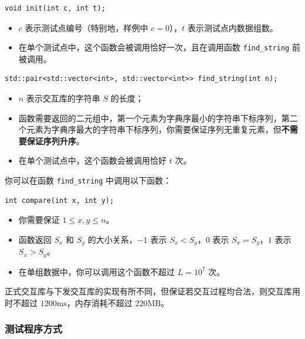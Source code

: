 \documentclass[12pt,a4paper,oneside]{ctexart}
\newcommand{\tightlist}{}
\begin{document}
\begin{verbatim}
void init(int c, int t);
\end{verbatim}

\begin{itemize}
\tightlist
\item
  \(c\) 表示测试点编号（特别地，样例中 \(c = 0\)），\(t\) 表示测试点内数据组数。
\item
  在单个测试点中，这个函数会被调用恰好一次，且在调用函数 \texttt{find\_string} 前被调用。
\end{itemize}

\begin{verbatim}
std::pair<std::vector<int>, std::vector<int>> find_string(int n);
\end{verbatim}

\begin{itemize}
\tightlist
\item
  \(n\) 表示交互库的字符串 \(S\) 的长度；
\item
  函数需要返回的二元组中，第一个元素为字典序最小的字符串下标序列，第二个元素为字典序最大的字符串下标序列，你需要保证序列无重复元素，但\textbf{不需要保证序列升序}。
\item
  在单个测试点中，这个函数会被调用恰好 \(t\) 次。
\end{itemize}

你可以在函数 \texttt{find\_string} 中调用以下函数：

\begin{verbatim}
int compare(int x, int y);
\end{verbatim}

\begin{itemize}
\tightlist
\item
  你需要保证 \(1 \leq x,y \leq n\)。
\item
  函数返回 \(S_{x}\) 和 \(S_{y}\) 的大小关系，\(-1\) 表示 \(S_{x} < S_{y}\)，\(0\) 表示 \(S_{x} = S_{y}\)，\(1\) 表示 \(S_{x} > S_{y}\)。
\item
  在单组数据中，你可以调用这个函数不超过 \(L = 10^{7}\) 次。
\end{itemize}

正式交互库与下发交互库的实现有所不同，但保证若交互过程均合法，则交互库用时不超过 \(1200 \text{ms}\)，内存消耗不超过 \(220 \text{MB}\)。

\subsubsection{测试程序方式}\label{ux6d4bux8bd5ux7a0bux5e8fux65b9ux5f0f}
\end{document}
